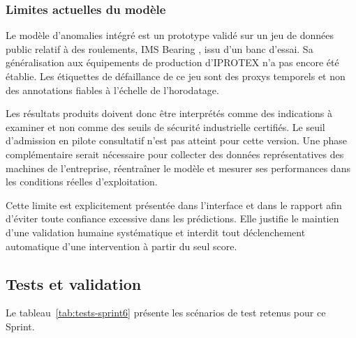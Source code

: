 \subsubsection{Limites actuelles du modèle}
\label{subsec:limites-modele}

Le modèle d'anomalies intégré est un prototype validé sur un jeu de données public relatif à des roulements, IMS Bearing \cite{nasa_ims}, issu d'un banc d'essai. Sa généralisation aux équipements de production d'IPROTEX n'a pas encore été établie. Les étiquettes de défaillance de ce jeu sont des proxys temporels et non des annotations fiables à l'échelle de l'horodatage.

Les résultats produits doivent donc être interprétés comme des indications à examiner et non comme des seuils de sécurité industrielle certifiés. Le seuil d'admission en pilote consultatif n'est pas atteint pour cette version. Une phase complémentaire serait nécessaire pour collecter des données représentatives des machines de l'entreprise, réentraîner le modèle et mesurer ses performances dans les conditions réelles d'exploitation.

Cette limite est explicitement présentée dans l'interface et dans le rapport afin d'éviter toute confiance excessive dans les prédictions. Elle justifie le maintien d'une validation humaine systématique et interdit tout déclenchement automatique d'une intervention à partir du seul score.


\subsection{Tests et validation}

Le tableau~\ref{tab:tests-sprint6} présente les scénarios de test retenus pour ce Sprint.

